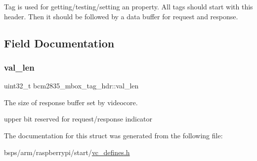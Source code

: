 Tag is used for getting/testing/setting an property. All tags should start with this header. Then it should be followed by a data buffer for request and response. 

\subsection{Field Documentation}
\mbox{\label{structbcm2835__mbox__tag__hdr_acedc82bb5b00c29f41aa762751f31ade}} 
\subsubsection{\texorpdfstring{val\_len}{val\_len}}
{\footnotesize\ttfamily uint32\+\_\+t bcm2835\+\_\+mbox\+\_\+tag\+\_\+hdr\+::val\+\_\+len}



The size of response buffer set by videocore. 

upper bit reserved for request/response indicator 

The documentation for this struct was generated from the following file\+:\begin{DoxyCompactItemize}
\item 
bsps/arm/raspberrypi/start/\mbox{\hyperlink{vc__defines_8h}{vc\+\_\+defines.\+h}}\end{DoxyCompactItemize}
